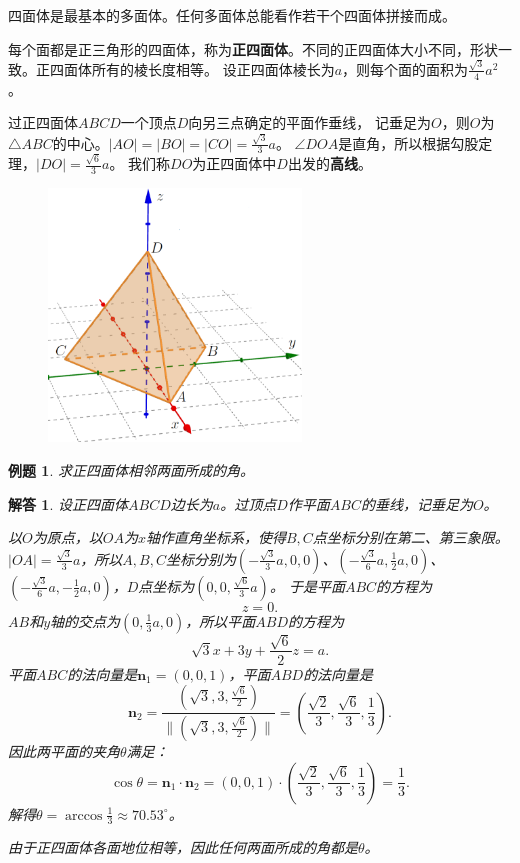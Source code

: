 \documentclass[12pt,UTF8]{ctexbook}
\newtheorem{et}{例题}[section]
\newtheorem*{so}{解答}
\begin{document}
四面体是最基本的多面体。任何多面体总能看作若干个四面体拼接而成。

每个面都是正三角形的四面体，称为\textbf{正四面体}。不同的正四面体大小不同，形状一致。正四面体所有的棱长度相等。
设正四面体棱长为$a$，则每个面的面积为$\frac{\sqrt{3}}{4}a^2$。

过正四面体$ABCD$一个顶点$D$向另三点确定的平面作垂线，
记垂足为$O$，则$O$为$\triangle ABC$的中心。$|AO|=|BO|=|CO|=\frac{\sqrt{3}}{3}a$。
$\angle DOA$是直角，所以根据勾股定理，$|DO| = \frac{\sqrt{6}}{3}a$。
我们称$DO$为正四面体中$D$出发的\textbf{高线}。

\begin{figure}[h] 
    \centering
    \includegraphics[width=0.6\textwidth]{正四面体2.png}
\end{figure}

\begin{et}
    求正四面体相邻两面所成的角。
\end{et}
\begin{so}
    设正四面体$ABCD$边长为$a$。过顶点$D$作平面$ABC$的垂线，记垂足为$O$。
    
    以$O$为原点，以$OA$为$x$轴作直角坐标系，使得$B,C$点坐标分别在第二、第三象限。
    $|OA|=\frac{\sqrt{3}}{3}a$，所以$A,B,C$坐标分别为$(-\frac{\sqrt{3}}{3}a, 0, 0)$、$(-\frac{\sqrt{3}}{6}a, \frac{1}{2}a, 0)$、
    $(-\frac{\sqrt{3}}{6}a, -\frac{1}{2}a, 0)$，$D$点坐标为$(0,0,\frac{\sqrt{6}}{3}a)$。
    于是平面$ABC$的方程为
    $$z=0.$$
    $AB$和$y$轴的交点为$(0,\frac{1}{3}a,0)$，所以平面$ABD$的方程为
    $$\sqrt{3}x + 3y + \frac{\sqrt{6}}{2}z = a.$$
    平面$ABC$的法向量是$\mathbf{n}_1 = (0,0,1)$，平面$ABD$的法向量是
    $$\mathbf{n}_2 = \frac{(\sqrt{3}, 3, \frac{\sqrt{6}}{2})}{\|(\sqrt{3}, 3, \frac{\sqrt{6}}{2})\|} = (\frac{\sqrt{2}}{3}, \frac{\sqrt{6}}{3}, \frac{1}{3}).$$
    因此两平面的夹角$\theta$满足：
    $$ \cos{\theta} = \mathbf{n}_1\cdot \mathbf{n}_2 = (0,0,1)\cdot(\frac{\sqrt{2}}{3}, \frac{\sqrt{6}}{3}, \frac{1}{3}) = \frac{1}{3}.$$
    解得$\theta = \arccos{\frac{1}{3}} \approx 70.53^\circ$。

    由于正四面体各面地位相等，因此任何两面所成的角都是$\theta$。
\end{so}
\end{document}
